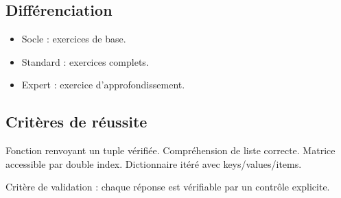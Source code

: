 \subsection{Différenciation}

\begin{itemize}
\tightlist
\item
  Socle : exercices de base.
\item
  Standard : exercices complets.
\item
  Expert : exercice d'approfondissement.
\end{itemize}

\subsection{Critères de réussite}

Fonction renvoyant un tuple vérifiée. Compréhension de liste correcte.
Matrice accessible par double index. Dictionnaire itéré avec
keys/values/items.

Critère de validation : chaque réponse est vérifiable par un contrôle
explicite.
